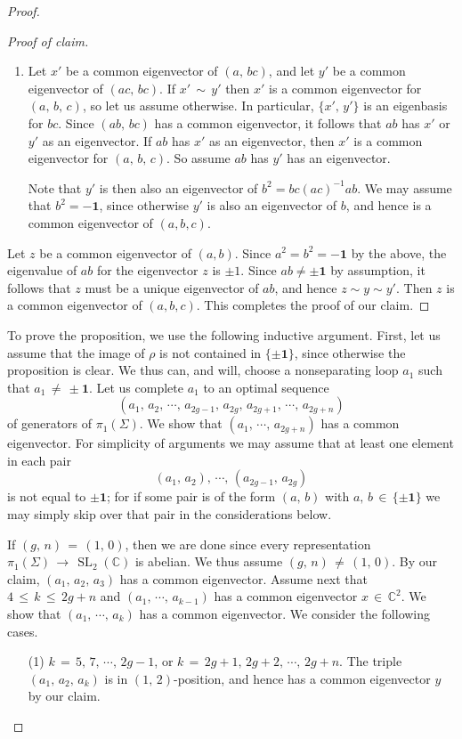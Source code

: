 \documentclass[reqno]{amsart}
\theoremstyle{plain}
\theoremstyle{definition}
\theoremstyle{remark}
\newcommand{\C}{{\mathbb{C}}}
\DeclareMathOperator{\SL}{SL}
\begin{document}
\begin{proof}
\begin{proof}[Proof of claim]
\begin{enumerate}
Note that $y$ is then also an eigenvector of $a^2=ab(cb)^{-1}ca$. We may assume that $a^2=-\mathbf 1$, since otherwise $y$ is also an eigenvector of $a$, and hence is a common eigenvector of $(a,b,c)$.

\item Let $x'$ be a common eigenvector of $(a,\,bc)$, and let $y'$ be a common eigenvector of $(ac,\,bc)$. If
$x'\,\sim\, y'$ then $x'$ is a common eigenvector for $(a,\,b,\,c)$, so let us assume otherwise. In particular,
$\{x',\,y'\}$ is an eigenbasis for $bc$. Since $(ab,\,bc)$ has a common eigenvector, it follows that $ab$ has
$x'$ or $y'$ as an eigenvector. If $ab$ has $x'$ as an eigenvector, then $x'$ is a common eigenvector for $(a,\,b,
\,c)$. So assume $ab$ has $y'$ has an eigenvector.

Note that $y'$ is then also an eigenvector of $b^2=bc(ac)^{-1}ab$. We may assume that $b^2=-\mathbf 1$, since otherwise $y'$ is also an eigenvector of $b$, and hence is a common eigenvector of $(a,b,c)$.

\end{enumerate}
Let $z$ be a common eigenvector of $(a,b)$. Since $a^2=b^2=-\mathbf 1$ by the above, the eigenvalue of $ab$ for the eigenvector $z$ is $\pm1$. Since $ab\neq\pm\mathbf1$ by assumption, it follows that $z$ must be a unique eigenvector of $ab$, and hence $z\sim y\sim y'$. Then $z$ is a common eigenvector of $(a,b,c)$. This completes the proof of our claim.
\end{proof}

To prove the proposition, we use the following inductive argument. First, let us assume that the image of 
$\rho$ is not contained in $\{\pm\mathbf 1\}$, since otherwise the proposition is clear. We thus can, and will, 
choose a nonseparating loop $a_1$ such that $a_1\,\neq\,\pm\mathbf 1$. Let us complete $a_1$ to an optimal sequence
$$(a_1,\,a_2,\,\cdots,\,a_{2g-1},\,a_{2g},\,a_{2g+1},\,\cdots,\,a_{2g+n})$$
of generators of $\pi_1(\Sigma)$. We show that $(a_1,\,\cdots,\,a_{2g+n})$ has a common eigenvector. For
simplicity of arguments we may assume that at least one element in each pair
$$(a_1,\,a_2),\,\cdots,\,(a_{2g-1},\,a_{2g})$$
is not equal to $\pm\mathbf 1$; for if some pair is of the form $(a,\,b)$ with $a,\,b\,\in\,\{\pm\mathbf 1\}$ we
may simply skip over that pair in the considerations below.

If $(g,\,n)\,=\,(1,\,0)$, then we are done since every representation $\pi_1(\Sigma)\,\to\,\SL_2(\C)$
is abelian. We thus assume $(g,\,n)\,\neq\,(1,\,0)$. By our claim, $(a_1,\,a_2,\,a_3)$ has a common
eigenvector. Assume next that $4\,\leq\, k\,\leq\, 2g+n$ and $(a_1,\,\cdots,\,a_{k-1})$ has a common eigenvector
$x\,\in\,\C^2$. We show that $(a_1,\,\cdots,\,a_k)$ has a common eigenvector. We consider the following cases.
\begin{enumerate}
	\item[\textup{(1)}] $k\,=\,5,\,7,\,\cdots,\,2g-1$, or $k\,=\,2g+1,\,2g+2,\,\cdots,\,2g+n$. The triple
$(a_1,\,a_2,\,a_k)$ is in $(1,\,2)$-position, and hence has a common eigenvector $y$ by our claim.
	

\end{enumerate}
\end{proof}
\end{document}
